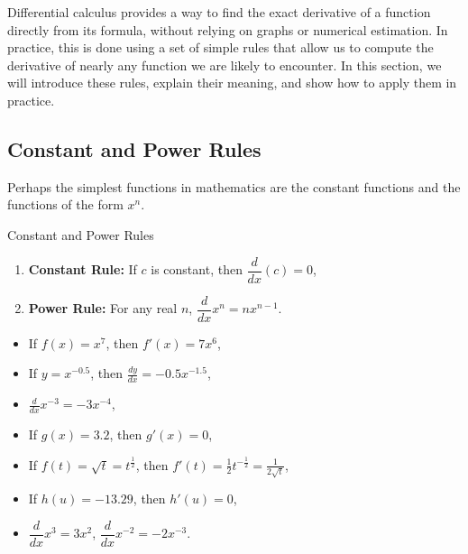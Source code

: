 Differential calculus provides a way to find the exact derivative of a function directly from its formula, without relying on graphs or numerical estimation. In practice, this is done using a set of simple rules that allow us to compute the derivative of nearly any function we are likely to encounter. In this section, we will introduce these rules, explain their meaning, and show how to apply them in practice.


\subsection*{Constant and Power Rules}
Perhaps the simplest functions in mathematics are the constant functions and the functions of the form $x^{n}$.\\

\begin{theorem}{Constant and Power Rules}
    \begin{enumerate}
        \item \textbf{Constant Rule:} If $c$ is constant, then $\dfrac{d}{dx}(c) = 0$, \vspace{0.5em}
        \item \textbf{Power Rule:} For any real $n$, $\dfrac{d}{dx}x^n = n x^{n - 1}$. \vspace{0.5em}
    \end{enumerate}
\end{theorem}

\begin{example}

    \begin{itemize}
        \item If \(f(x)=x^7\), then \(f'(x) = 7x^6\),
        \vspace{0.5em}
        \item If \(y = x^{-0.5}\), then \(\frac{dy}{dx} = -0.5x^{-1.5}\),
        \vspace{0.5em}
        \item \(\frac{d}{dx} x^{-3} = -3x^{-4}\),
        \vspace{0.5em}
        \item If \(g(x) = 3.2\), then \(g'(x) = 0\),
        \vspace{0.5em}
        \item If \(f(t) = \sqrt{t}=t^{\frac{1}{2}}\), then \(f'(t) = \frac{1}{2} t^{-\frac{1}{2}}=\frac{1}{2 \sqrt{t}} \),
        \vspace{0.5em}
        \item If \(h(u) = -13.29\), then \(h'(u) = 0\),
        \vspace{0.5em}
        \item $\dfrac{d}{dx}x^3 = 3x^2$,
        $\dfrac{d}{dx}x^{-2} = -2x^{-3}$.
    \end{itemize}

\end{example}

